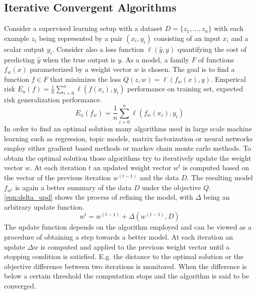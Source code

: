 \subsection{Iterative Convergent Algorithms}
\label{ss:ica}
Consider a supervised learning setup with a dataset $D = \{z_1,\ldots,z_n\}$ with each example $z_i$ being represented by a pair $(x_i,y_i)$ consisting of an input $x_i$ and a scalar output $y_i$.
Consider also a loss function $\ell(\hat{y},y)$ quantifying the cost of predicting $\hat{y}$ when the true output is $y$. As a model, a family $F$ of functions $f_w(x)$ parameterized by a weight vector $w$ is chosen.
The goal is to find a function $f \in F$ that minimizes the loss $Q(z, w) = \ell(f_w(x),y)$. Emperical risk $E_n(f) = \frac{1}{n}\sum_{i=0}^{n}\ell(f(x_i),y_i)$ performance on training set, expected risk generalization performance.
\begin{equation}
E_n(f_w) = \frac{1}{n}\sum_{i=0}^{n} \ell(f_w(x_i),y_i)
\label{eqn:emp_risk}
\end{equation}
In order to find an optimal solution many algorithms used in large scale machine learning such as regression, topic models, matrix factorization or neural networks employ either gradient based methods or markov chain monte carlo methods.
To obtain the optimal solution those algorithms try to iteratively update the weight vector $w$. At each iteration $t$ an updated weight vector $w^{t}$ is computed based on the vector of the previous iteration $w^{(t-1)}$ and the data $D$. The resulting model $f_{w^{t}}$ is again a better summary of the data $D$ under the objective $Q$. \ref{eqn:delta_upd} shows the process of refining the model, with $\Delta$ being an arbitrary update function.
\begin{equation}
w^{t} = w^{(t-1)} + \Delta(w^{(t-1)},D)
\label{eqn:delta_upd}
\end{equation}
The update function depends on the algorithm employed and can be viewed as a procedure of obtaining a step towards a better model. At each iteration an update $\Delta w$ is computed and applied to the previous weight vector until a stopping condition is satisfied. E.g. the distance to the optimal solution or the objective difference between two iterations is monitored. When the difference is below a certain threshold the computation stops and the algorithm is said to be converged.


